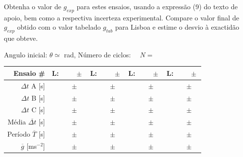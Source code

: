 \documentclass[a4paper,12pt]{article}      %
\begin{document}
Obtenha o valor de $g_{exp}$ para estes ensaios, usando a expressão (9) do texto de apoio, bem como a respectiva incerteza experimental. 
Compare o valor final de $g_{exp}$ obtido com o valor tabelado $g_{tab}$ para Lisboa e estime o desvio à exactidão que obteve. 

\begin{center}
\begin{small}
	\noindent Angulo inicial:	$\theta \simeq$ \underline{\makebox[1.5cm][r]{~}} rad,  Número de ciclos: $\quad N=$\underline{\makebox[1cm][r]{~}} \\
\bigskip
\begin{tabular}{|r|c|c|c|c|}
\hline
Ensaio  \# & L: $\qquad \pm$ \qquad [m] & L: $\qquad \pm$ \qquad[m] & L: $\qquad \pm$ \qquad[m] & L: $\qquad \pm$ \qquad[m]\\
\hline \hline
$\Delta t$ A  [s]&  $\qquad \pm$ \quad &  $\qquad \pm$ \quad&  $\qquad \pm$ \quad&  $\qquad \pm$ \quad\\ \hline
$\Delta t$ B  [s]&  $\qquad \pm$ \quad &  $\qquad \pm$ \quad&  $\qquad \pm$ \quad&  $\qquad \pm$ \quad\\ \hline
$\Delta t$ C  [s]&  $\qquad \pm$ \quad &  $\qquad \pm$ \quad&  $\qquad \pm$ \quad&  $\qquad \pm$ \quad\\ \hline
\hline 
Média $\overline{\Delta t}$ [s] & $\qquad \pm$ \quad  & $\qquad \pm$ \quad  &  $\qquad \pm$ \quad  & $\qquad \pm$ \quad \\
Período $\overline{T}$ [s] & $\qquad \pm$ \quad  & $\qquad \pm$ \quad  &  $\qquad \pm$ \quad  &  $\qquad \pm$ \quad  \\
 $\overline{g}$ [ms$^{-2}$] & $\qquad \pm$ \quad  & $\qquad \pm$ \quad  & $\qquad \pm$ \quad & $\qquad \pm$ \quad \\
\hline

\end{tabular}
\end{small}
\end{center}
\end{document}
